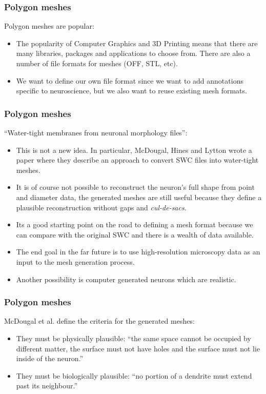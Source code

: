 \documentclass{beamer}
\begin{document}
\begin{frame}
\frametitle{Polygon meshes}

Polygon meshes are popular:

\pause

\begin{itemize}
\item The popularity of Computer Graphics and 3D Printing means that
  there are many libraries, packages and applications to choose
  from. There are also a number of file formats for meshes (OFF, STL,
  etc).
\pause
\item We want to define our own file format since we want to add
  annotations specific to neuroscience, but we also want to reuse
  existing mesh formats.
\end{itemize}

\end{frame}

\begin{frame}
\frametitle{Polygon meshes}

``Water-tight membranes from neuronal morphology files'':

\begin{itemize}
\item This is not a new idea. In particular, McDougal, Hines and
  Lytton wrote a paper\cite{mcdougal2013water} where they describe an
  approach to convert SWC files into water-tight meshes.
\pause
\item It is of course not possible to reconstruct the neuron's full
  shape from point and diameter data, the generated meshes are still
  useful because they define a plausible reconstruction without gaps
  and \emph{cul-de-sacs}.
\pause
\item Its a good starting point on the road to defining a mesh format
  because we can compare with the original SWC and there is a wealth
  of data available.
\pause
\item The end goal in the far future is to use high-resolution
  microscopy data as an input to the mesh generation process.
\pause
\item Another possibility is computer generated neurons which are
  realistic.
\end{itemize}

\end{frame}

\begin{frame}
\frametitle{Polygon meshes}

McDougal et al. define the criteria for the generated meshes:

\begin{itemize}
\item They must be physically plausible: ``the same space cannot be
  occupied by different matter, the surface must not have holes and
  the surface must not lie inside of the
  neuron.''\cite{mcdougal2013water}
\pause
\item They must be biologically plausible: ``no portion of a dendrite
  must extend past its neighbour.''\cite{mcdougal2013water}
\end{itemize}

\end{frame}
\end{document}

